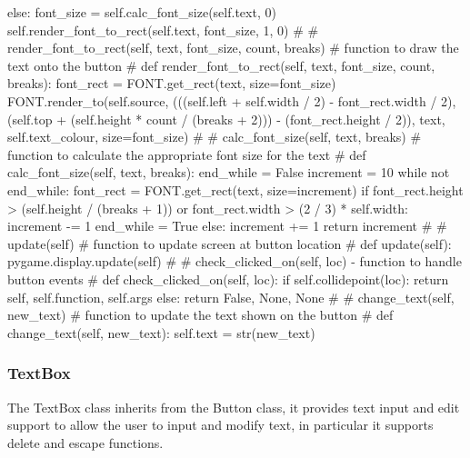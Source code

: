 \documentclass[fleqn]{article}
\begin{document}
\begin{python}
        else:
            font_size = self.calc_font_size(self.text, 0)
            self.render_font_to_rect(self.text, font_size, 1, 0)
#
# render_font_to_rect(self, text, font_size, count, breaks)
# function to draw the text onto the button
#
    def render_font_to_rect(self, text, font_size, count, breaks):
        font_rect = FONT.get_rect(text, size=font_size)
        FONT.render_to(self.source, (((self.left + self.width / 2) - font_rect.width / 2),
                                     (self.top + (self.height * count / (breaks + 2))) - (font_rect.height / 2)),
                       text, self.text_colour, size=font_size)
#
# calc_font_size(self, text, breaks)
# function to calculate the appropriate font size for the text
#
    def calc_font_size(self, text, breaks):
        end_while = False
        increment = 10
        while not end_while:
            font_rect = FONT.get_rect(text, size=increment)
            if font_rect.height > (self.height / (breaks + 1)) or font_rect.width > (2 / 3) * self.width:
                increment -= 1
                end_while = True
            else:
                increment += 1
        return increment
#
# update(self) 
# function to update screen at button location
#
    def update(self):
        pygame.display.update(self)
#
# check_clicked_on(self, loc) - function to handle button events
#
    def check_clicked_on(self, loc):
        if self.collidepoint(loc):
            return self, self.function, self.args
        else:
            return False, None, None
#
# change_text(self, new_text) 
# function to update the text shown on the button
#
    def change_text(self, new_text):
        self.text = str(new_text)
\end{python}

\subsubsection{TextBox}

The TextBox class inherits from the Button class, it provides text input and edit  support to allow the user to input and modify text, in particular it supports delete and escape functions.
\end{document}
